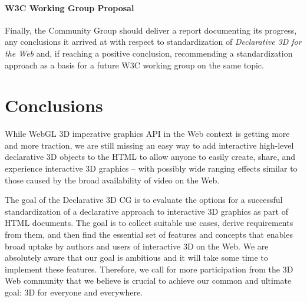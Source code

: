 \documentclass[review]{acmsiggraph}
\begin{document}
\paragraph{W3C Working Group Proposal}
Finally, the Community Group should deliver a report documenting its progress, any conclusions it arrived at with respect to standardization of \textit{Declarative 3D for the Web} and, if reaching a positive conclusion, recommending a standardization approach as a basis for a future W3C working group on the same topic.

\newpage

\section{Conclusions}
\label{sec:Conclusions}
While WebGL 3D imperative graphics API in the Web context is getting more and more traction, we are still missing an easy way to add interactive high-level declarative 3D objects to the HTML to allow anyone to easily create, share, and experience interactive 3D graphics – with possibly wide ranging effects similar to those caused by the broad availability of video on the Web.

The goal of the Declarative 3D CG is to evaluate the options for a successful standardization of a declarative approach to interactive 3D graphics as part of HTML documents. The goal is to collect suitable use cases, derive requirements from them, and then find the essential set of features and concepts that enables broad uptake by authors and users of interactive 3D on the Web.
We are absolutely aware that our goal is ambitious and it will take some time to implement these features. Therefore, we call for more participation from the 3D Web community that we believe is crucial to achieve our common and ultimate goal: 3D for everyone and everywhere.




\end{document}
